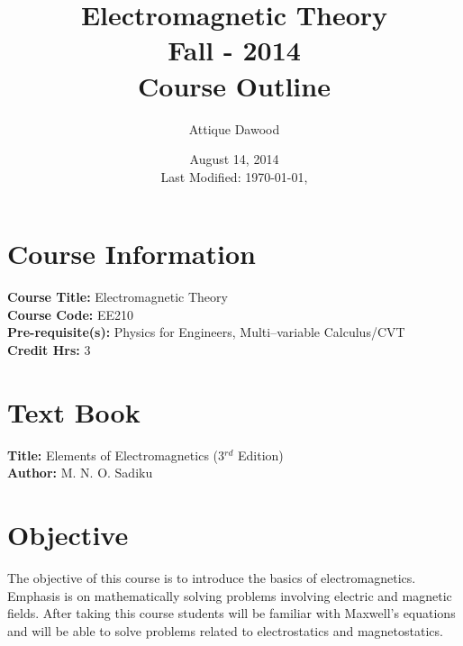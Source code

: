 \documentclass[12pt,a4paper]{article}
\title{\vspace{-1.5cm}Electromagnetic Theory\\Fall - 2014\\Course Outline}
\author{Attique Dawood}
\date{August 14, 2014\\[0.2cm] Last Modified: \today, \currenttime}
\begin{document}
\maketitle
\section{Course Information}
\noindent\textbf{Course Title:} Electromagnetic Theory\\
\textbf{Course Code:} EE210\\
\textbf{Pre-requisite(s):} Physics for Engineers, Multi--variable Calculus/CVT\\
\textbf{Credit Hrs:} 3\\
\section{Text Book}
\textbf{Title:} Elements of Electromagnetics (3$^{rd}$ Edition)\\
\textbf{Author:} M. N. O. Sadiku\\[0.5cm]
\section{Objective}
The objective of this course is to introduce the basics of electromagnetics. Emphasis is on mathematically solving problems involving electric and magnetic fields. After taking this course students will be familiar with Maxwell’s equations and will be able to solve problems related to electrostatics and magnetostatics.
\end{document}
